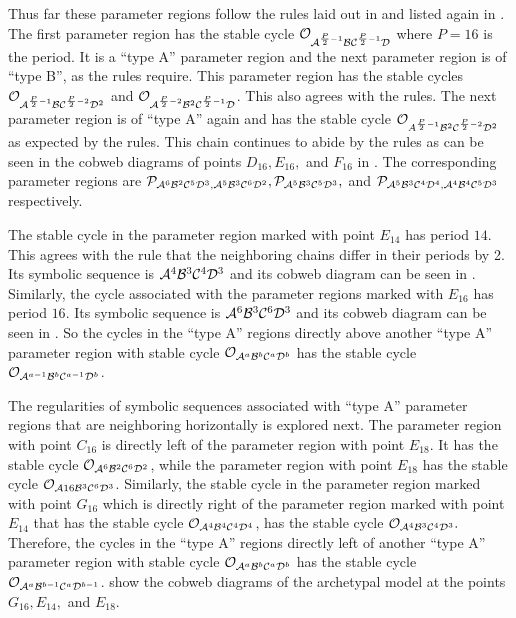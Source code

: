 Thus far these parameter regions follow the rules laid out in \cite{akyuz2022} and listed again in .
The first parameter region has the stable cycle $\mathcal{O}_{\mathcal{A}^{\frac{P}{2} - 1}\mathcal{B}\mathcal{C}^{\frac{P}{2} - 1}\mathcal{D}}$ where $P = 16$ is the period.
It is a ``type A'' parameter region and the next parameter region is of ``type B'', as the rules require.
This parameter region has the stable cycles $\mathcal{O}_{\mathcal{A}^{\frac{P}{2} - 1}\mathcal{B}\mathcal{C}^{\frac{P}{2} - 2}\mathcal{D}^2}$ and $\mathcal{O}_{\mathcal{A}^{\frac{P}{2} - 2}\mathcal{B}^2\mathcal{C}^{\frac{P}{2} - 1}\mathcal{D}}$.
This also agrees with the rules.
The next parameter region is of ``type A'' again and has the stable cycle $\mathcal{O}_{A^{\frac{P}{2} - 1}\mathcal{B}^2\mathcal{C}^{\frac{P}{2} - 2}\mathcal{D}^2}$ as expected by the rules.
This chain continues to abide by the rules as can be seen in the cobweb diagrams of points $D_{16}, E_{16},$ and $F_{16}$ in .
The corresponding parameter regions are $\mathcal{P}_{\mathcal{A}^6\mathcal{B}^2\mathcal{C}^5\mathcal{D}^3, \mathcal{A}^5\mathcal{B}^3\mathcal{C}^6\mathcal{D}^2}, \mathcal{P}_{\mathcal{A}^5\mathcal{B}^3\mathcal{C}^5\mathcal{D}^3},$ and $\mathcal{P}_{\mathcal{A}^5\mathcal{B}^3\mathcal{C}^4\mathcal{D}^4, \mathcal{A}^4\mathcal{B}^4\mathcal{C}^5\mathcal{D}^3}$ respectively.

The stable cycle in the parameter region marked with point $E_{14}$ has period $14$.
This agrees with the rule that the neighboring chains differ in their periods by 2.
Its symbolic sequence is $\mathcal{A}^4\mathcal{B}^3\mathcal{C}^4\mathcal{D}^3$ and its cobweb diagram can be seen in .
Similarly, the cycle associated with the parameter regions marked with $E_{16}$ has period $16$.
Its symbolic sequence is $\mathcal{A}^6\mathcal{B}^3\mathcal{C}^6\mathcal{D}^3$ and its cobweb diagram can be seen in .
So the cycles in the ``type A'' regions directly above another ``type A'' parameter region with stable cycle $\mathcal{O}_{\mathcal{A}^a\mathcal{B}^b\mathcal{C}^a\mathcal{D}^b}$ has the stable cycle $\mathcal{O}_{\mathcal{A}^{a-1}\mathcal{B}^b\mathcal{C}^{a-1}\mathcal{D}^b}$.

The regularities of symbolic sequences associated with ``type A'' parameter regions that are neighboring horizontally is explored next.
The parameter region with point $C_{16}$ is directly left of the parameter region with point $E_{18}$.
It has the stable cycle $\mathcal{O}_{\mathcal{A}^6\mathcal{B}^2\mathcal{C}^6\mathcal{D}^2}$, while the parameter region with point $E_{18}$ has the stable cycle $\mathcal{O}_{\mathcal{A}16\mathcal{B}^3\mathcal{C}^6\mathcal{D}^3}$.
Similarly, the stable cycle in the parameter region marked with point $G_{16}$ which is directly right of the parameter region marked with point $E_{14}$ that has the stable cycle $\mathcal{O}_{\mathcal{A}^4\mathcal{B}^4\mathcal{C}^4\mathcal{D}^4}$, has the stable cycle $\mathcal{O}_{\mathcal{A}^4\mathcal{B}^3\mathcal{C}^4\mathcal{D}^3}.$
Therefore, the cycles in the ``type A'' regions directly left of another ``type A'' parameter region with stable cycle $\mathcal{O}_{\mathcal{A}^a\mathcal{B}^b\mathcal{C}^a\mathcal{D}^b}$ has the stable cycle $\mathcal{O}_{\mathcal{A}^a\mathcal{B}^{b-1}\mathcal{C}^a\mathcal{D}^{b-1}}$.
 show the cobweb diagrams of the archetypal model at the points $G_{16}, E_{14},$ and $E_{18}$.

